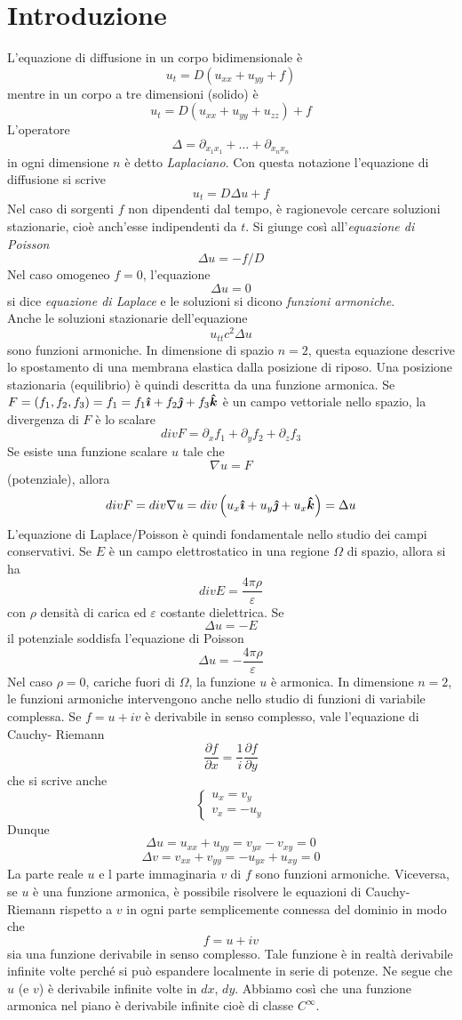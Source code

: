 \section{Introduzione}
L'equazione di diffusione in un corpo bidimensionale \`e
\[
	u_t= D(u_{xx}+ u_{yy} +f)
\]
mentre in un corpo a tre dimensioni (solido) \`e
\[
	u_t=D\left( u_{xx}+u_{yy} +u_{zz} \right) +f
\]
L'operatore 
\[
	\Delta= \partial_{x_1x_1}+ \ldots + \partial_{x_n x_n}
\]
in ogni dimensione $n$ \`e detto \textit{Laplaciano}. Con questa notazione
l'equazione di diffusione si scrive 
\[
	u_t= D\Delta u +f
\]
Nel caso di sorgenti $f$ non dipendenti dal tempo, \`e ragionevole cercare 
soluzioni stazionarie, cio\`e anch'esse indipendenti da $t$.
Si giunge cos\`i all'\textit{equazione di Poisson}
\[
	\Delta u= -f/D
\]
Nel caso omogeneo $f=0$, l'equazione
\[
	\Delta u=0
\]
si dice \textit{equazione di Laplace} e le soluzioni si dicono 
\textit{funzioni armoniche}.\\
Anche le soluzioni stazionarie dell'equazione
\[
	u_{tt}c^2 \Delta u
\]
sono funzioni armoniche. In dimensione di spazio $n=2$, questa equazione
descrive lo spostamento di una membrana elastica dalla posizione di riposo.
Una posizione stazionaria (equilibrio) \`e quindi descritta da una funzione
armonica.
Se $F=(f_1,f_2, f_3)=f_1= f_1 \boldsymbol{\hat{\imath}} + f_2 \boldsymbol{\hat{\jmath}} + f_3 \boldsymbol{\hat{k}}$ \`e un campo
vettoriale nello spazio, la divergenza di $F$ \`e lo scalare
\[
	div F= \partial_x f_1 + \partial_y f_2 + \partial_z f_3
\]
Se esiste una funzione scalare $u$ tale che
\[
	\nabla u= F
\]
(potenziale), allora
\[
	div F= div \nabla u = div \left( u_x \boldsymbol{\hat{\imath}} +u_y \boldsymbol{\hat{\jmath}} + u_x \boldsymbol{\hat{k}} \right)
	=\Delta u
\]
L'equazione di Laplace/Poisson \`e quindi fondamentale nello studio dei campi conservativi. Se $E$ \`e un campo elettrostatico in una regione $\Omega$
di spazio, allora si ha
\[
	div E= \frac{4 \pi \rho}{\varepsilon}
\]
con $\rho$ densit\`a di carica ed $\varepsilon$ costante dielettrica. Se
\[
	\Delta u= -E
\]
il potenziale soddisfa l'equazione di Poisson
\[
	\Delta u= - \frac{4 \pi \rho}{\varepsilon}
\]
Nel caso $\rho=0$, cariche fuori di $\Omega$, la funzione $u$ \`e armonica.
In dimensione $n=2$, le funzioni armoniche intervengono anche nello studio
di funzioni di variabile complessa.
Se $f= u+iv$ \`e derivabile in senso complesso, vale l'equazione di 
Cauchy- Riemann
\[
	\frac{\partial f}{\partial x}= \frac{1}{i} \frac{\partial f}
	{\partial y}
\]
che si scrive anche 
\[
	\left\{ 
	\begin{array}{l}
		u_x=v_y \\
		v_x=- u_y
	\end{array}
	\right.
\]
Dunque
\[
	\Delta u= u_{xx}+ u_{yy}= v_{yx}-v_{xy}=0
\]
\[
	\Delta v= v_{xx}+ v_{yy}= -u_{yx} +u_{xy}=0
\]
La parte reale $u$ e l parte immaginaria $v$ di $f$ sono funzioni
armoniche.
Viceversa, se $u$ \`e una funzione armonica, \`e possibile risolvere le
equazioni di Cauchy-Riemann rispetto a $v$ in ogni parte semplicemente connessa
del dominio in modo che 
\[
	f= u+ iv
\]
sia una funzione derivabile in senso complesso.
Tale funzione \`e in realt\`a derivabile infinite volte perch\'e si pu\`o
espandere localmente in serie di potenze. Ne segue che $u$ (e $v$) \`e
derivabile infinite volte in $dx$, $dy$.
Abbiamo cos\`i che una funzione armonica nel piano \`e derivabile infinite
cio\`e di classe $C^{\infty}$.
